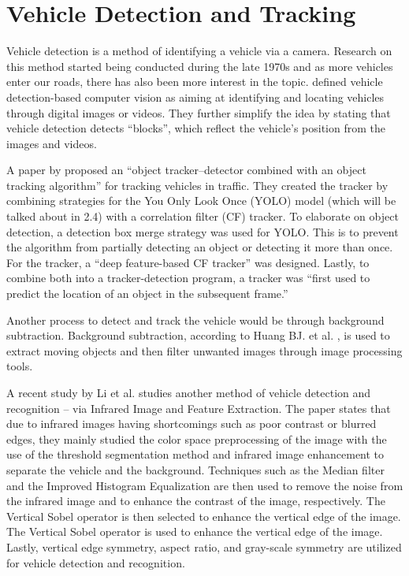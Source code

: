 \section{Vehicle Detection and Tracking}

	Vehicle detection is a method of identifying a vehicle via a camera. Research on this method started being conducted during the late 1970s \cite{NathDeb2012} and as more vehicles enter our roads, there has also been more interest in the topic. \cite{Meng_2020} defined vehicle detection-based computer vision as aiming at identifying and locating vehicles through digital images or videos. They further simplify the idea by stating that vehicle detection detects “blocks”, which reflect the vehicle’s position from the images and videos.

	A paper by \cite{yang_2020} proposed an “object tracker–detector combined with an object tracking algorithm” for tracking vehicles in traffic. They created the tracker by combining strategies for the You Only Look Once (YOLO) model (which will be talked about in 2.4) with a correlation filter (CF) tracker. To elaborate on object detection, a detection box merge strategy was used for YOLO. This is to prevent the algorithm from partially detecting an object or detecting it more than once. For the tracker, a “deep feature-based CF tracker” was designed. Lastly, to combine both into a tracker-detection program, a tracker was “first used to predict the location of an object in the subsequent frame.”

	Another process to detect and track the vehicle would be through background subtraction. Background subtraction, according to Huang BJ. et al. \citeyear{Huang_2017}, is used to extract moving objects and then filter unwanted images through image processing tools. 
	
	A recent study by Li et al. \citeyear{li_2022} studies another method of vehicle detection and recognition – via Infrared Image and Feature Extraction. The paper states that due to infrared images having shortcomings such as poor contrast or blurred edges, they mainly studied the color space preprocessing of the image with the use of the threshold segmentation method and infrared image enhancement to separate the vehicle and the background. Techniques such as the Median filter and the Improved Histogram Equalization are then used to remove the noise from the infrared image and to enhance the contrast of the image, respectively. The Vertical Sobel operator is then selected to enhance the vertical edge of the image. The Vertical Sobel operator is used to enhance the vertical edge of the image. Lastly, vertical edge symmetry, aspect ratio, and gray-scale symmetry are utilized for vehicle detection and recognition.


